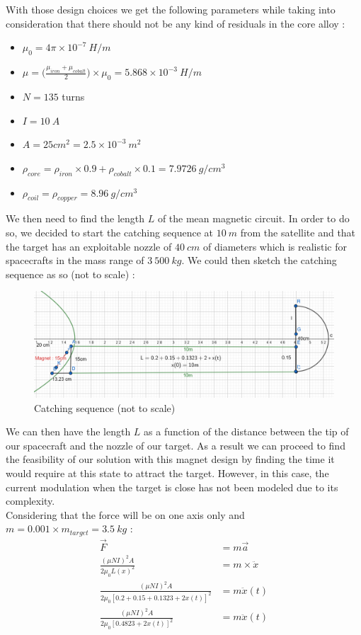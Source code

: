 With those design choices we get the following parameters while taking into consideration that there should not be any kind of residuals in the core alloy :

\begin{itemize}
	\item $\mu_0 = 4\pi \times 10^{-7}\ H/m$
	\item $\mu = \bigg(\frac{\mu_{iron}+\mu_{cobalt}}{2}\bigg)\times\mu_0=5.868\times10^{-3}\ H/m$
	\item $N=135$ turns
	\item $I = 10\ A$
	\item $A = 25cm^2=2.5\times10^{-3}\ m^2$
	\item $\rho_{core} = \rho_{iron}\times 0.9 + \rho_{cobalt}\times0.1 = 7.9726\ g/cm^3$
	\item $\rho_{coil} = \rho_{copper} = 8.96\ g/cm^3$
\end{itemize}

We then need to find the length $L$ of the mean magnetic circuit. In order to do so, we decided to start the catching sequence at $10\ m$ from the satellite and that the target has an exploitable nozzle of $40\ cm$ of diameters which is realistic for spacecrafts in the mass range of $3\ 500\ kg$. We could then sketch the catching sequence as so (not to scale) :

\begin{figure}[H]
	\centering
	\includegraphics[width=\linewidth]{catching}
	\caption{Catching sequence (not to scale)}
\end{figure}
We can then have the length $L$ as a function of the distance between the tip of our spacecraft and the nozzle of our target. As a result we can proceed to find the feasibility of our solution with this magnet design by finding the time it would require at this state to attract the target. However, in this case, the current modulation when the target is close has not been modeled due to its complexity.\\

Considering that the force will be on one axis only and $m = 0.001\times m_{target} = 3.5\ kg$ :
\begin{align}
\vec F &= m\vec a\\
\frac{(\mu NI)^2 A}{2\mu_0 L(x)^2} &= m \times \ddot x\\
\frac{(\mu NI)^2 A}{2\mu_0 [0.2 + 0.15 + 0.1323 + 2x(t)]^2} &= m \ddot x(t)\\
\frac{(\mu NI)^2 A}{2\mu_0 [0.4823 + 2x(t)]^2} &= m \ddot x(t)
\end{align}

